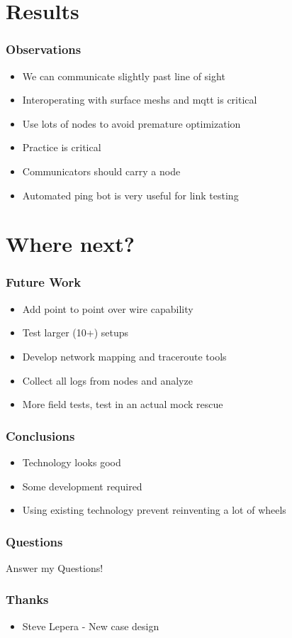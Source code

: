 \documentclass{beamer}
\begin{document}
\section{Results}

\begin{frame}

\frametitle{Observations}

\begin{itemize}
\item We can communicate slightly past line of sight
\item Interoperating with surface meshs and mqtt is critical
\item Use lots of nodes to avoid premature optimization
\item Practice is critical
\item Communicators should carry a node
\item Automated ping bot is very useful for link testing
\end{itemize}

\end{frame}

\section{Where next?}

\begin{frame}
\frametitle{Future Work}

\begin{itemize}
\item Add point to point over wire capability
\item Test larger (10+) setups
\item Develop network mapping and traceroute tools
\item Collect all logs from nodes and analyze
\item More field tests, test in an actual mock rescue
\end{itemize}

\end{frame}


\begin{frame}
\frametitle{Conclusions}

\begin{itemize}
\item Technology looks good
\item Some development required
\item Using existing technology prevent reinventing a lot of wheels
\end{itemize}
\end{frame}

\begin{frame}
\frametitle{Questions}

Answer my Questions!

\end{frame}

\begin{frame}
\frametitle{Thanks}

\begin{itemize}
\item Steve Lepera - New case design
\end{itemize}

\end{frame}
\end{document}

